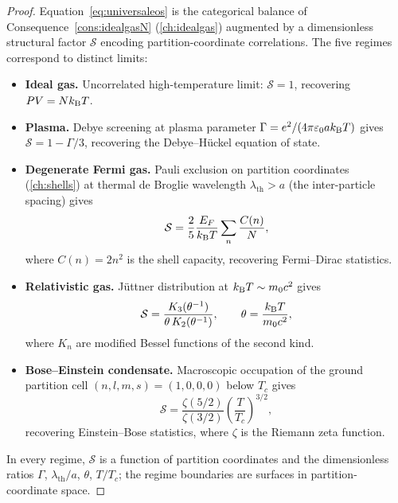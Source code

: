 \begin{proof}
Equation~\eqref{eq:universaleos} is the categorical balance of
Consequence~\ref{cons:idealgasN} (\cref{ch:idealgas}) augmented by a
dimensionless structural factor $\mathcal{S}$ encoding partition-coordinate
correlations.  The five regimes correspond to distinct limits:

\begin{itemize}[nosep]
  \item \textbf{Ideal gas.}  Uncorrelated high-temperature limit:
    $\mathcal{S} = 1$, recovering $PV = Nk_{\mathrm{B}} T$.

  \item \textbf{Plasma.}  Debye screening at plasma parameter
    $\Gamma = e^2/(4\pi\varepsilon_0 ak_{\mathrm{B}} T)$ gives
    $\mathcal{S} = 1 - \Gamma/3$,
    recovering the Debye--H\"uckel equation of state.

  \item \textbf{Degenerate Fermi gas.}  Pauli exclusion on partition
    coordinates (\cref{ch:shells}) at thermal de Broglie wavelength
    $\lambda_{\mathrm{th}} > a$ (the inter-particle spacing) gives
    \[
      \mathcal{S}
      = \frac{2}{5}\frac{E_F}{k_{\mathrm{B}} T}
        \sum_n \frac{C(n)}{N},
    \]
    where $C(n) = 2n^2$ is the shell capacity, recovering Fermi--Dirac
    statistics.

  \item \textbf{Relativistic gas.}  J\"uttner distribution at
    $k_{\mathrm{B}} T \sim m_0 c^2$ gives
    \[
      \mathcal{S}
      = \frac{K_3(\theta^{-1})}{\theta\, K_2(\theta^{-1})},
      \qquad
      \theta = \frac{k_{\mathrm{B}} T}{m_0 c^2},
    \]
    where $K_n$ are modified Bessel functions of the second kind.

  \item \textbf{Bose--Einstein condensate.}  Macroscopic occupation of
    the ground partition cell $(n,l,m,s) = (1,0,0,0)$ below $T_c$ gives
    \[
      \mathcal{S}
      = \frac{\zeta(5/2)}{\zeta(3/2)}
        \left(\frac{T}{T_c}\right)^{3/2},
    \]
    recovering Einstein--Bose statistics, where $\zeta$ is the Riemann
    zeta function.
\end{itemize}

In every regime, $\mathcal{S}$ is a function of partition coordinates and
the dimensionless ratios $\Gamma$, $\lambda_{\mathrm{th}}/a$, $\theta$,
$T/T_c$; the regime boundaries are surfaces in partition-coordinate space.
\end{proof}

